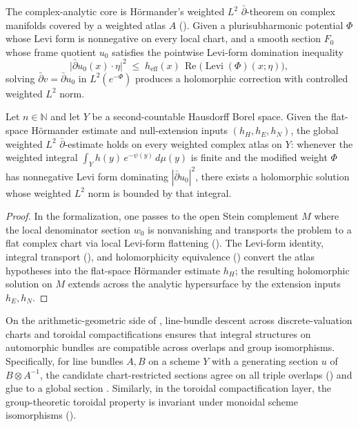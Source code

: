 The complex-analytic core is H\"ormander's weighted $L^2$ $\bar{\partial}$-theorem
on complex manifolds covered by a weighted atlas $A$
().
Given a plurisubharmonic potential $\Phi$ whose Levi form is nonnegative on
every local chart, and a smooth section $F_0$ whose frame quotient $u_0$
satisfies the pointwise Levi-form domination inequality
\[
  \bigl\lvert \bar{\partial} u_0(x) \cdot \eta \bigr\rvert^2
  \;\le\;
  h_{\mathrm{eff}}(x)\,\operatorname{Re}\bigl(\operatorname{Levi}(\Phi)(x; \eta)\bigr),
\]
solving $\bar{\partial} v = \bar{\partial} u_0$ in $L^2(e^{-\Phi})$ produces a
holomorphic correction with controlled weighted $L^2$ norm.

\begin{theorem}
\label{thm:ch03-l2-dbar}
Let $n \in \mathbb{N}$ and let $Y$ be a second-countable Hausdorff Borel space.
Given the flat-space H\"ormander estimate and null-extension inputs
$(h_H, h_E, h_N)$, the global weighted $L^2$ $\bar{\partial}$-estimate holds on
every weighted complex atlas on $Y$: whenever the weighted integral
$\int_Y h(y)\, e^{-\psi(y)}\, d\mu(y)$ is finite and the modified weight $\Phi$
has nonnegative Levi form dominating $|\bar{\partial} u_0|^2$, there exists a
holomorphic solution whose weighted $L^2$ norm is bounded by that integral.
\end{theorem}

\begin{proof}
In the formalization, one passes to the open Stein complement $M$ where the
local denominator section $w_0$ is nonvanishing and transports the problem to
a flat complex chart via local Levi-form flattening
().
The Levi-form identity, integral transport
(), and
holomorphicity equivalence
() convert the
atlas hypotheses into the flat-space H\"ormander estimate $h_H$; the resulting
holomorphic solution on $M$ extends across the analytic hypersurface by the
extension inputs $h_E, h_N$.
\end{proof}

On the arithmetic-geometric side of ,
line-bundle descent across discrete-valuation charts and toroidal
compactifications ensures that integral structures on automorphic bundles are
compatible across overlaps and group isomorphisms.
Specifically, for line bundles $A, B$ on a scheme $Y$ with a generating
section $u$ of $B \otimes A^{-1}$, the candidate chart-restricted sections
 agree on all
triple overlaps ()
and glue to a global section .
Similarly, in the toroidal compactification layer, the group-theoretic
toroidal property is invariant under monoidal scheme isomorphisms
().

